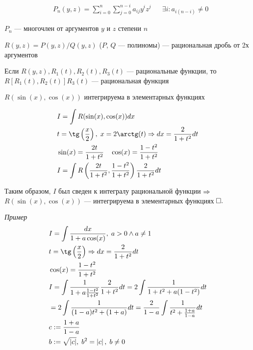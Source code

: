 \documentclass{article}
\begin{document}

\begin{align*}
	 & P_{n}(y,z)=\sum_{i=0}^{n}\sum_{j=0}^{n-i}a_{ij}y^{i}z^{j} &  & \exists i:a_{i(n-i)}\neq 0
\end{align*}

$P_{n}$ --- многочлен от аргументов $y$ и $z$ степени $n$

$R(y,z)=P(y,z)/Q(y,z)$ ($P$, $Q$ --- полиномы) --- рациональная дробь от 2х аргументов

Если $R(y,z),R_1(t),R_2(t),R_3(t)$ --- рациональные функции, то\\
$R[R_1(t),R_2(t)]R_3(t)$ --- рациональная функция

\theorem

$R(\sin(x),\cos(x))$ интегрируема в элементарных функциях

\proof
\begin{align*}
	 & I=\int R(\sin(x),\cos(x))dx                                                        \\
	 & t=\tg\left(\frac{x}{2}\right),\;x=2\arctg(t)\Rarr dx=\frac{2}{1+t^{2}}dt           \\
	 & \sin(x)=\frac{2t}{1+t^{2}}\quad\cos(x)=\frac{1-t^{2}}{1+t^{2}}                     \\
	 & I=\int R\left(\frac{2t}{1+t^{2}},\frac{1-t^{2}}{1+t^{2}}\right)\frac{2}{1+t^{2}}dt
\end{align*}

Таким образом, $I$ был сведен к интегралу рациональной функции $\Rarr$ $R(\sin(x),\cos(x))$ --- интегрируема в элементарных функциях$\qed$

{\it Пример}
\begin{align*}
	 & I=\int\frac{dx}{1+a\cos(x)},\;a>0\land a \neq 1                                                   \\
	 & t=\tg\left(\frac{x}{2}\right)\Rarr dx=\frac{2}{1+t^{2}}dt                                         \\
	 & \cos(x)=\frac{1-t^{2}}{1+t^{2}}                                                                   \\
	 & I=\int\frac{1}{1+a\frac{1-t^{2}}{1+t^{2}}}\frac{2}{1+t^{2}}dt=2\int\frac{1}{1+t^{2}+a(1-t^{2})}dt \\
	 & =2\int\frac{1}{(1-a)t^{2}+(1+a)}dt=\frac{2}{1-a}\int\frac{1}{t^{2}+\frac{1+a}{1-a}}dt             \\
	 & c:=\frac{1+a}{1-a}                                                                                \\
	 & b:=\sqrt{\left|c\right|},\;b^{2}=\left|c\right|,\;b\neq 0
\end{align*}
\end{document}

